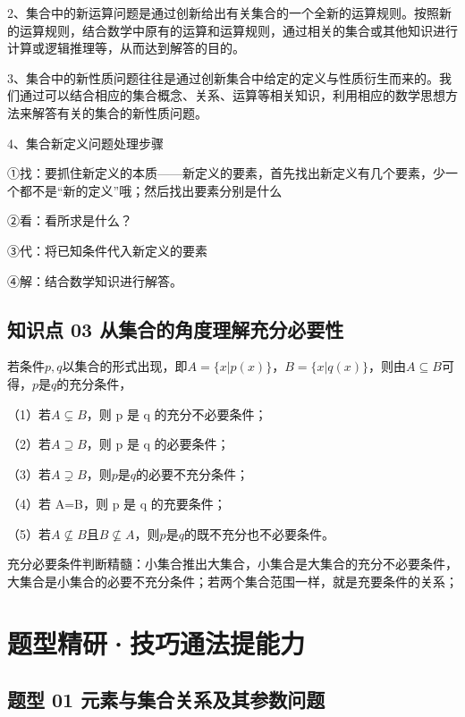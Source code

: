 \documentclass[11pt,a4paper]{ctexart}
\begin{document}
2、集合中的新运算问题是通过创新给出有关集合的一个全新的运算规则。按照新的运算规则，结合数学中原有的运算和运算规则，通过相关的集合或其他知识进行计算或逻辑推理等，从而达到解答的目的。

3、集合中的新性质问题往往是通过创新集合中给定的定义与性质衍生而来的。我们通过可以结合相应的集合概念、关系、运算等相关知识，利用相应的数学思想方法来解答有关的集合的新性质问题。

4、集合新定义问题处理步骤

①找：要抓住新定义的本质------新定义的要素，首先找出新定义有几个要素，少一个都不是``新的定义''哦；然后找出要素分别是什么

②看：看所求是什么？

③代：将已知条件代入新定义的要素

④解：结合数学知识进行解答。

\subsection{知识点 03
从集合的角度理解充分必要性}\label{ux77e5ux8bc6ux70b9-03-ux4eceux96c6ux5408ux7684ux89d2ux5ea6ux7406ux89e3ux5145ux5206ux5fc5ux8981ux6027}

若条件\(p, q\)以集合的形式出现，即\(A = \{x | p(x)\}\)，\(B = \{x | q(x)\}\)，则由\(A \subseteq B\)可得，\(p\)是\(q\)的充分条件，

（1）若\(A \subsetneq B\)，则 p 是 q 的充分不必要条件；

（2）若\(A \supseteq B\)，则 p 是 q 的必要条件；

（3）若\(A \supsetneq B\)，则\(p\)是\(q\)的必要不充分条件；

（4）若 A=B，则 p 是 q 的充要条件；

（5）若\(A \not\subseteq B\)且\(B \not\subseteq A\)，则\(p\)是\(q\)的既不充分也不必要条件。

充分必要条件判断精髓：小集合推出大集合，小集合是大集合的充分不必要条件，大集合是小集合的必要不充分条件；若两个集合范围一样，就是充要条件的关系；

\section{题型精研·技巧通法提能力}\label{ux9898ux578bux7cbeux7814ux6280ux5de7ux901aux6cd5ux63d0ux80fdux529b}

\subsection{题型 01
元素与集合关系及其参数问题}\label{ux9898ux578b-01-ux5143ux7d20ux4e0eux96c6ux5408ux5173ux7cfbux53caux5176ux53c2ux6570ux95eeux9898}
\end{document}
